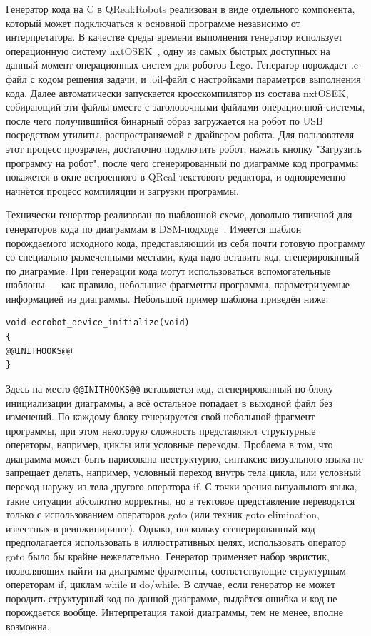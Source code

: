\documentclass[a4paper]{article}
\begin{document}
Генератор кода на C в QReal:Robots реализован в виде отдельного компонента, который может подключаться к основной программе независимо от интерпретатора. В качестве среды времени выполнения генератор использует операционную систему nxtOSEK~\cite{nxtOsek}, одну из самых быстрых доступных на данный момент операционных систем для роботов Lego. Генератор порождает .c-файл с кодом решения задачи, и .oil-файл с настройками параметров выполнения кода. Далее автоматически запускается кросскомпилятор из состава nxtOSEK, собирающий эти файлы вместе с заголовочными файлами операционной системы, после чего получившийся бинарный образ загружается на робот по USB посредством утилиты, распространяемой с драйвером робота. Для пользователя этот процесс прозрачен, достаточно подключить робот, нажать кнопку "Загрузить программу на робот", после чего сгенерированный по диаграмме код программы покажется в окне встроенного в QReal текстового редактора, и одновременно начнётся процесс компиляции и загрузки программы.

Технически генератор реализован по шаблонной схеме, довольно типичной для генераторов кода по диаграммам в DSM-подходе~\cite{theBook}. Имеется шаблон порождаемого исходного кода, представляющий из себя почти готовую программу со специально размеченными местами, куда надо вставить код, сгенерированный по диаграмме. При генерации кода могут использоваться вспомогательные шаблоны --- как правило, небольшие фрагменты программы, параметризуемые информацией из диаграммы. Небольшой пример шаблона приведён ниже:
\begin{verbatim}
void ecrobot_device_initialize(void)
{
@@INITHOOKS@@
}
\end{verbatim}
Здесь на место \verb|@@INITHOOKS@@| вставляется код, сгенерированный по блоку инициализации диаграммы, а всё остальное попадает в выходной файл без изменений. По каждому блоку генерируется свой небольшой фрагмент программы, при этом некоторую сложность представляют структурные операторы, например, циклы или условные переходы. Проблема в том, что диаграмма может быть нарисована неструктурно, синтаксис визуального языка не запрещает делать, например, условный переход внутрь тела цикла, или условный переход наружу из тела другого оператора if. С точки зрения визуального языка, такие ситуации абсолютно корректны, но в тектовое представление переводятся только с использованием операторов goto (или техник goto elimination, известных в реинжиниринге). Однако, поскольку сгенерированный код предполагается использовать в иллюстративных целях, использовать оператор goto было бы крайне нежелательно. Генератор применяет набор эвристик, позволяющих найти на диаграмме фрагменты, соответствующие структурным операторам if, циклам while и do/while. В случае, если генератор не может породить структурный код по данной диаграмме, выдаётся ошибка и код не порождается вообще. Интерпретация такой диаграммы, тем не менее, вполне возможна.
\end{document}
